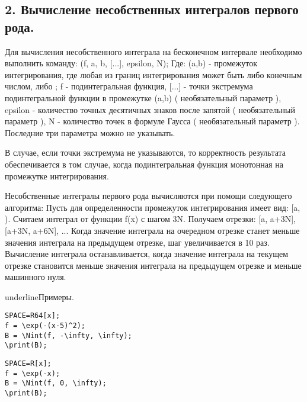 \subsection{2. Вычисление несобственных интегралов первого рода.}
Для вычисления несобственного интеграла на бесконечном интервале необходимо выполнить команду:
\Nint(f, a, b, [...], epsilon, N);
Где: 
(a,b) - промежуток интегрирования, где любая из границ интегрирования может быть либо конечным числом, либо \pm\infty;
f - подинтегральная функция,
[...] - точки экстремума подинтегральной функции в промежутке (a,b) ( необязательный параметр ),
epsilon - количество точных десятичных знаков после запятой ( необязательный параметр ),
N - количество точек в формуле Гаусса ( необязательный параметр ).
Последние три параметра можно не указывать.


В случае, если точки экстремума не указываются, то корректность результата обеспечивается в том случае,
когда подинтегральная функция монотонная на промежутке интегрирования.


Несобственные интегралы первого рода вычисляются при помощи следующего алгоритма:
Пусть для определенности промежуток интегрирования имеет вид: [a, \infty). 
Считаем интеграл от функции f(x) с шагом 3N. Получаем отрезки: [a, a+3N], [a+3N, a+6N], ...
Когда значение интеграла на очередном отрезке станет меньше значения интеграла на предыдущем отрезке,
шаг увеличивается  в 10 раз.
Вычисление интеграла останавливается, когда значение интеграла на текущем отрезке становится 
меньше значения интеграла на предыдущем отрезке и меньше машинного нуля.

underline{Примеры.  }
\vspace*{-2mm}
\begin{verbatim}
SPACE=R64[x];
f = \exp(-(x-5)^2);
B = \Nint(f, -\infty, \infty); 
\print(B);
\end{verbatim}




\begin{verbatim}
SPACE=R[x];
f = \exp(-x);
B = \Nint(f, 0, \infty); 
\print(B);
\end{verbatim}

